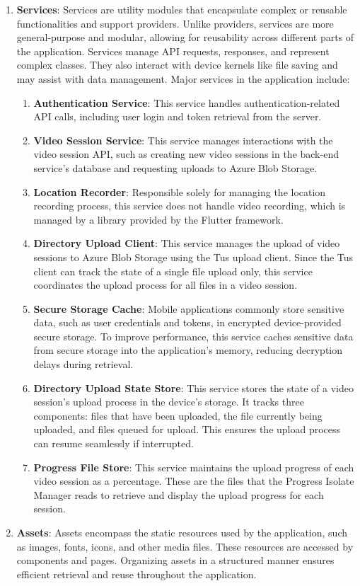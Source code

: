 \begin{enumerate}
    \item \textbf{Services}: Services are utility modules that encapsulate complex or reusable functionalities and support providers. Unlike providers, services are more general-purpose and modular, allowing for reusability across different parts of the application. Services manage API requests, responses, and represent complex classes. They also interact with device kernels like file saving and may assist with data management. Major services in the application include:
    \begin{enumerate}  
        \item \textbf{Authentication Service}: This service handles authentication-related API calls, including user login and token retrieval from the server.  
        \item \textbf{Video Session Service}: This service manages interactions with the video session API, such as creating new video sessions in the back-end service's database and requesting uploads to Azure Blob Storage.  
        \item \textbf{Location Recorder}: Responsible solely for managing the location recording process, this service does not handle video recording, which is managed by a library provided by the Flutter framework.  
        \item \textbf{Directory Upload Client}: This service manages the upload of video sessions to Azure Blob Storage using the Tus upload client. Since the Tus client can track the state of a single file upload only, this service coordinates the upload process for all files in a video session.  
        \item \textbf{Secure Storage Cache}: Mobile applications commonly store sensitive data, such as user credentials and tokens, in encrypted device-provided secure storage. To improve performance, this service caches sensitive data from secure storage into the application's memory, reducing decryption delays during retrieval.  
        \item \textbf{Directory Upload State Store}: This service stores the state of a video session's upload process in the device's storage. It tracks three components: files that have been uploaded, the file currently being uploaded, and files queued for upload. This ensures the upload process can resume seamlessly if interrupted.  
        \item \textbf{Progress File Store}: This service maintains the upload progress of each video session as a percentage. These are the files that the Progress Isolate Manager reads to retrieve and display the upload progress for each session.
    \end{enumerate}  
    
    \item \textbf{Assets}: Assets encompass the static resources used by the application, such as images, fonts, icons, and other media files. These resources are accessed by components and pages. Organizing assets in a structured manner ensures efficient retrieval and reuse throughout the application.
\end{enumerate}
